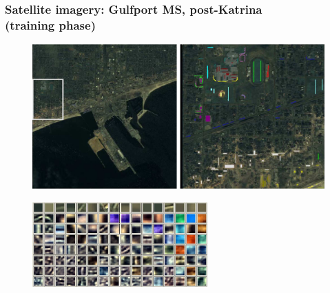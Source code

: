 \begin{frame}
\frametitle{\small Satellite imagery: Gulfport MS, post-Katrina \\(training phase)}
\logoCSIPCPL\mypagenum
	\begin{figure}		
		\includegraphics[width=1.0\textwidth]{figs/RVQ_SatelliteKatrina_1_snippets.png}			
	\end{figure}
	\begin{figure}		
		\includegraphics[width=0.6\textwidth]{figs/RVQ_SatelliteKatrina_2_codebooks.png}			
	\end{figure}
\end{frame}


